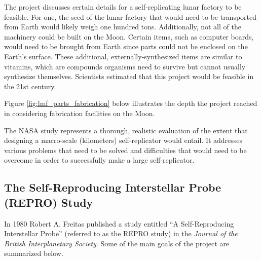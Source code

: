 

The project discusses certain details for a self-replicating lunar factory to be feasible. For one, the seed of the lunar factory that would need to be transported from Earth would likely weigh one hundred tons. Additionally, not all of the machinery could be built on the Moon. Certain items, such as computer boards, would need to be brought from Earth since parts could not be enclosed on the Earth’s surface. These additional, externally-synthesized items are similar to vitamins, which are compounds organisms need to survive but cannot usually synthesize themselves.  Scientists estimated that this project would be feasible in the 21st century.

Figure \ref{fig:lmf_parts_fabrication} below illustrates the depth the project reached in considering
fabrication facilities on the Moon.


The NASA study represents a thorough, realistic evaluation of the extent that designing a macro-scale (kilometers) self-replicator would entail. It addresses various problems that need to be solved and difficulties that would need to be overcome in order to successfully make a large self-replicator.

\subsection[The Self{}-Reproducing Interstellar Probe (REPRO) Study]{The
Self-Reproducing Interstellar Probe (REPRO) Study}

In 1980 Robert A. Freitas
published a study entitled ``A Self-Reproducing Interstellar Probe'' (referred to as the REPRO study) in
the \textit{Journal of the British Interplanetary Society}. Some of the
main goals of the project are summarized below.

